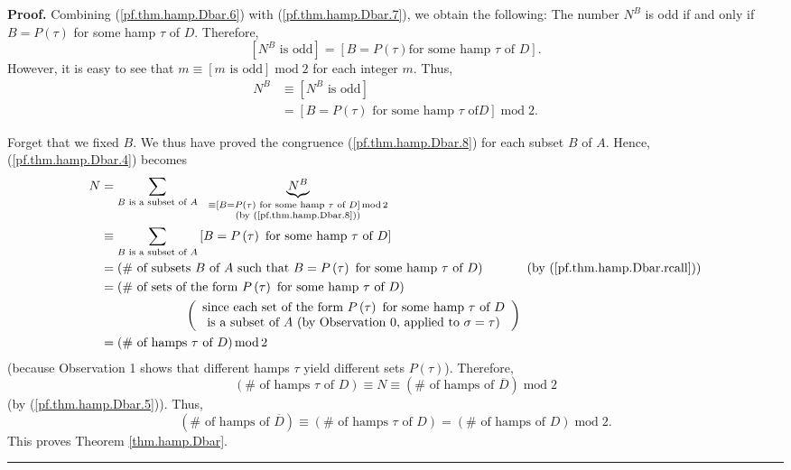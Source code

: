 \documentclass[numbers=enddot,12pt,final,onecolumn,notitlepage]{scrartcl}%
\numberwithin{exer}{subsection}
\theoremstyle{definition}
\newenvironment{proof}[1][Proof]{\noindent\textbf{#1.} }{\ \rule{0.5em}{0.5em}}
\let\sumnonlimits\sum
\renewcommand{\sum}{\sumnonlimits\limits}
\begin{document}
\begin{proof}
Combining (\ref{pf.thm.hamp.Dbar.6}) with (\ref{pf.thm.hamp.Dbar.7}), we
obtain the following: The number $N^{B}$ is odd if and only if $B=P\left(
\tau\right)  $ for some hamp $\tau$ of $D$. Therefore,%
\[
\left[  N^{B}\text{ is odd}\right]  =\left[  B=P\left(  \tau\right)  \text{
for some hamp }\tau\text{ of }D\right]  .
\]
However, it is easy to see that $m\equiv\left[  m\text{ is odd}\right]
\operatorname{mod}2$ for each integer $m$. Thus,%
\begin{align}
N^{B}  &  \equiv\left[  N^{B}\text{ is odd}\right] \nonumber\\
&  =\left[  B=P\left(  \tau\right)  \text{ for some hamp }\tau\text{ of
}D\right]  \operatorname{mod}2. \label{pf.thm.hamp.Dbar.8}%
\end{align}


Forget that we fixed $B$. We thus have proved the congruence
(\ref{pf.thm.hamp.Dbar.8}) for each subset $B$ of $A$. Hence,
(\ref{pf.thm.hamp.Dbar.4}) becomes%
\begin{align*}
N  &  =\sum_{B\text{ is a subset of }A}\ \ \underbrace{N^{B}}%
_{\substack{\equiv\left[  B=P\left(  \tau\right)  \text{ for some hamp }%
\tau\text{ of }D\right]  \operatorname{mod}2\\\text{(by
(\ref{pf.thm.hamp.Dbar.8}))}}}\\
&  \equiv\sum_{B\text{ is a subset of }A}\left[  B=P\left(  \tau\right)
\text{ for some hamp }\tau\text{ of }D\right] \\
&  =\left(  \#\text{ of subsets }B\text{ of }A\text{ such that }B=P\left(
\tau\right)  \text{ for some hamp }\tau\text{ of }D\right)
\ \ \ \ \ \ \ \ \ \ \left(  \text{by (\ref{pf.thm.hamp.Dbar.rcall})}\right) \\
&  =\left(  \#\text{ of sets of the form }P\left(  \tau\right)  \text{ for
some hamp }\tau\text{ of }D\right) \\
&  \ \ \ \ \ \ \ \ \ \ \ \ \ \ \ \ \ \ \ \ \left(
\begin{array}
[c]{c}%
\text{since each set of the form }P\left(  \tau\right)  \text{ for some hamp
}\tau\text{ of }D\\
\text{is a subset of }A\text{ (by Observation 0, applied to }\sigma
=\tau\text{)}%
\end{array}
\right) \\
&  =\left(  \#\text{ of hamps }\tau\text{ of }D\right)  \operatorname{mod}2
\end{align*}
(because Observation 1 shows that different hamps $\tau$ yield different sets
$P\left(  \tau\right)  $). Therefore,%
\[
\left(  \#\text{ of hamps }\tau\text{ of }D\right)  \equiv N\equiv\left(
\#\text{ of hamps of }\overline{D}\right)  \operatorname{mod}2
\]
(by (\ref{pf.thm.hamp.Dbar.5})). Thus,%
\[
\left(  \#\text{ of hamps of }\overline{D}\right)  \equiv\left(  \#\text{ of
hamps }\tau\text{ of }D\right)  =\left(  \#\text{ of hamps of }D\right)
\operatorname{mod}2.
\]
This proves Theorem \ref{thm.hamp.Dbar}.
\end{proof}
\end{document}
